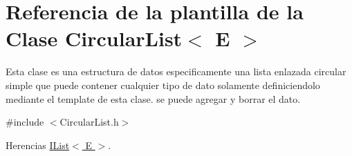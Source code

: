 \hypertarget{classCircularList}{\section{Referencia de la plantilla de la Clase Circular\-List$<$ E $>$}
\label{classCircularList}
}


Esta clase es una estructura de datos especificamente una lista enlazada circular simple que puede contener cualquier tipo de dato solamente definiciendolo mediante el template de esta clase. se puede agregar y borrar el dato.  




{\ttfamily \#include $<$Circular\-List.\-h$>$}



Herencias \hyperlink{classIList}{I\-List$<$ E $>$}.

